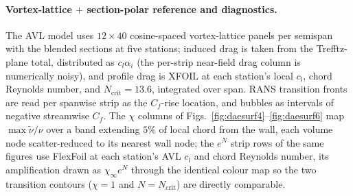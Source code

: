 \documentclass[journal]{new-aiaa}
\begin{document}
\paragraph{Vortex-lattice $+$ section-polar reference and diagnostics.} The AVL model uses
$12\times40$ cosine-spaced vortex-lattice panels per semispan with the
blended sections at five stations; induced drag is taken from the
Trefftz-plane total, distributed as $c_l\alpha_i$ (the per-strip
near-field drag column is numerically noisy), and profile drag is
XFOIL at each station's local $c_l$, chord Reynolds number, and
$N_\mathrm{crit}\!=\!13.6$, integrated over span. RANS transition
fronts are read per spanwise strip as the $C_f$-rise location, and
bubbles as intervals of negative streamwise $C_f$. The $\chi$ columns
of Figs.~\ref{fig:daesurf4}--\ref{fig:daesurf6} map
$\max\tilde\nu/\nu$ over a band extending $5\%$ of local chord from
the wall, each volume node scatter-reduced to its nearest wall node;
the $e^N$ strip rows of the same figures use FlexFoil at each
station's AVL $c_l$ and chord Reynolds number, its amplification drawn
as $\chi_\infty e^{N}$ through the identical colour map so the two
transition contours ($\chi\!=\!1$ and $N\!=\!N_\mathrm{crit}$) are
directly comparable.
\end{document}
